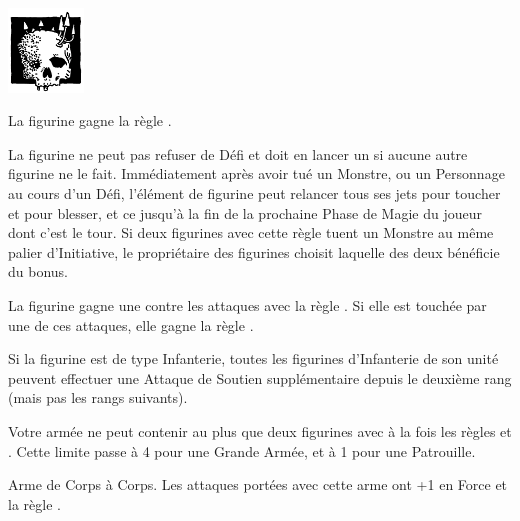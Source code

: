 \begin{multicols}{2}
\begin{center}\includegraphics[width=2cm]{pics/pestilence.png}

\noindent\textbf{\chosenofpestilence}
\end{center}

La figurine gagne la règle \fear{}.

\end{multicols}

\armyspecialruleentry{\gazeofthegods}

La figurine ne peut pas refuser de Défi et doit en lancer un si aucune autre figurine ne le fait. Immédiatement après avoir tué un Monstre, ou un Personnage au cours d'un Défi, l'élément de figurine peut relancer tous ses jets pour toucher et pour blesser, et ce jusqu'à la fin de la prochaine Phase de Magie du joueur dont c'est le tour. Si deux figurines avec cette règle tuent un Monstre au même palier d'Initiative,  le propriétaire des figurines choisit laquelle des deux bénéficie du bonus.

\armyspecialruleentry{\lightningrage}

La figurine gagne une  contre les attaques avec la règle \lightningattacks{}. Si elle est touchée par une de ces attaques, elle gagne la règle \frenzy{}.

\armyspecialruleentry{\inspiregreatness}

Si la figurine est de type Infanterie, toutes les figurines d'Infanterie de son unité peuvent effectuer une Attaque de Soutien supplémentaire depuis le deuxième rang (mais pas les rangs suivants).

\armyspecialruleentry{\survivalofthefittest}

Votre armée ne peut contenir au plus que deux figurines avec à la fois les règles \largetarget{} et \fly{}. Cette limite passe à 4 pour une Grande Armée, et à 1 pour une Patrouille.

\closearmyspecialrules







\newpage
\startarmyarmoury

\startitemlistonecol

\listitemonecol{\daemonweapon}Arme de Corps à Corps. Les attaques portées avec cette arme ont +1 en Force et la règle \magicalattacks{}.

